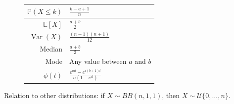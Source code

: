 \documentclass[a4paper,11pt]{article}
\theoremstyle{plain}
\theoremstyle{definition}
\newcommand{\ME}{\mathbb{E}}
\newcommand{\MP}{\mathbb{P}}
\newcommand{\Var}{\operatorname{Var}}
\begin{document}
\begin{figure}[!htb]
\begin{minipage}{0.4\textwidth}
\begin{tabular}{| r | l |}
				\hline
				$\MP(X \leq k)$ & $\frac{k-a+1}{n}$ \\
				\hline
				$\ME[X]$ & $ \frac{a+b}{2} $ \\
				\hline
				$\Var(X)$ & $ \frac{(n-1)(n+1)}{12}$\\
				\hline
				Median & $\frac{a+b}{2}$ \\
				\hline
				Mode & Any value between $a$ and $b$ \\
				\hline
				$\phi(t)$ & $\frac{e^{iat} - e^{i(b+1)t}}{n(1-e^{it})}$ \\
				\hline
			\end{tabular}
		\end{minipage}
	\end{figure}
	
	Relation to other distributions: if $X \sim BB(n, 1, 1)$, then $X \sim \mathcal{U}\{0, \dots, n\}$.
	
	\pagebreak
\end{document}
